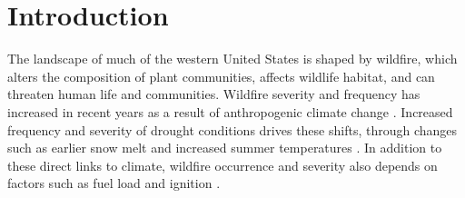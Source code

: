 \documentclass[11p]{article}
\begin{document}


\section{Introduction}

The landscape of much of the western United States is shaped by wildfire, which alters the composition of plant communities, affects wildlife habitat, and can threaten human life and communities. Wildfire severity and frequency has increased in recent years as a result of anthropogenic climate change \citep{abatzoglouImpactAnthropogenicClimate2016,runningGlobalWarmingCausing2006,boerChangingWeatherExtremes2017,littellReviewRelationshipsDrought2016}. Increased frequency and severity of drought conditions drives these shifts, through changes such as earlier snow melt \citep{tercekForecasts21stCentury2016} and increased summer temperatures \citep{runningGlobalWarmingCausing2006}. In addition to these direct links to climate, wildfire occurrence and severity also depends on factors such as fuel load and ignition \citep{mckenzieClimateChangeEcohydrology2017}.
\end{document}
